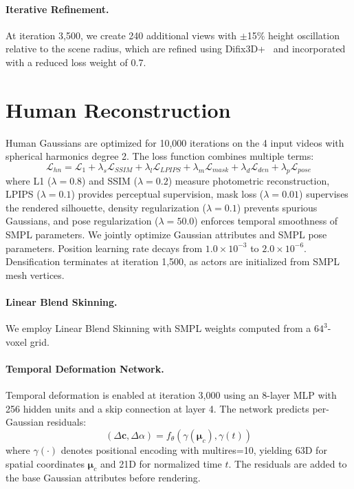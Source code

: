 \documentclass[acmtog]{acmart}
\begin{document}
\paragraph{Iterative Refinement.}
At iteration 3,500, we create 240 additional views with $\pm$15\% height oscillation relative to the scene radius, which are refined using Difix3D+~\cite{wu2025difix3d+} and incorporated with a reduced loss weight of 0.7.

\section{Human Reconstruction}
\label{sec:appendix_human}

Human Gaussians are optimized for 10,000 iterations on the 4 input videos with spherical harmonics degree 2.
The loss function combines multiple terms:
\begin{equation}
\mathcal{L}_{hn} = \mathcal{L}_1 + \lambda_s\mathcal{L}_{SSIM} + \lambda_l\mathcal{L}_{LPIPS} + \lambda_m\mathcal{L}_{mask} + \lambda_d\mathcal{L}_{den} + \lambda_p\mathcal{L}_{pose}
\end{equation}
where L1 ($\lambda = 0.8$) and SSIM ($\lambda = 0.2$) measure photometric reconstruction, LPIPS ($\lambda = 0.1$) provides perceptual supervision, mask loss ($\lambda = 0.01$) supervises the rendered silhouette, density regularization ($\lambda = 0.1$) prevents spurious Gaussians, and pose regularization ($\lambda = 50.0$) enforces temporal smoothness of SMPL parameters. We jointly optimize Gaussian attributes and SMPL pose parameters.
Position learning rate decays from $1.0 \times 10^{-3}$ to $2.0 \times 10^{-6}$.
Densification terminates at iteration 1,500, as actors are initialized from SMPL mesh vertices.

\paragraph{Linear Blend Skinning.}
We employ Linear Blend Skinning with SMPL weights computed from a $ 64^3$-voxel grid.

\paragraph{Temporal Deformation Network.}
Temporal deformation is enabled at iteration 3,000 using an 8-layer MLP with 256 hidden units and a skip connection at layer 4. The network predicts per-Gaussian residuals:
\begin{equation}
(\Delta\mathbf{c}, \Delta\alpha) = f_\theta(\gamma(\boldsymbol{\mu}_c), \gamma(t))
\end{equation}
where $\gamma(\cdot)$ denotes positional encoding with multires=10, yielding 63D for spatial coordinates $\boldsymbol{\mu}_c$ and 21D for normalized time $t$. The residuals are added to the base Gaussian attributes before rendering.
\end{document}
